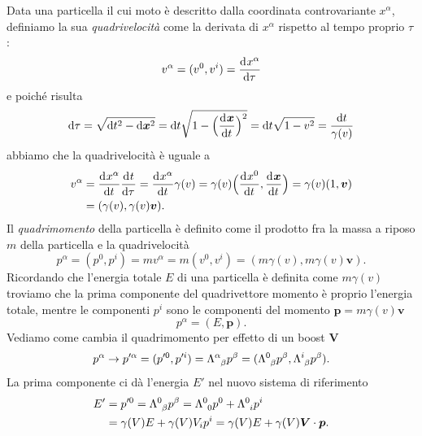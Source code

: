 Data una particella il cui moto è descritto dalla coordinata controvariante
$x^{\alpha}$, definiamo la sua \emph{quadrivelocità} come
la derivata di $x^{\alpha}$ rispetto al tempo proprio $\tau$:
\begin{equation}
  v^{\alpha} = (v^{0}, v^{i}) =\frac{{\mathop{}\!\mathrm{d}^{}}x^{\alpha}}{\mathop{}\!\mathrm{d} {\tau}^{}}
\end{equation}
e poiché risulta
\begin{equation}
  \dd \tau = \sqrt{\dd t^{2} - \dd \bm{x}^{2}} = \dd t \sqrt{1 -
    \Big(\toder{\bm{x}}{t}\Big)^{2}} = \dd t\sqrt{1 - v^{2}} = \frac{\dd
    t}{\gamma(v)}
\end{equation}
abbiamo che la quadrivelocità è uguale a
\begin{equation}
  \begin{split}
    v^{\alpha} &= \toder{x^{\alpha}}{t}\toder{t}{\tau} = \toder{x^{\alpha}}{t}
    \gamma(v) = \gamma(v) \Big(\toder{x^{0}}{t}, \toder{\bm{x}}{t}\Big) =
    \gamma(v)(1,\bm{v}) \\
    &= (\gamma(v), \gamma(v)\bm{v}).
  \end{split}
\end{equation}
Il \emph{quadrimomento} della particella è definito come il
prodotto fra la massa a riposo $m$ della particella e la quadrivelocità
\begin{equation}
  p^{\alpha} = (p^{0},p^{i}) = m v^{\alpha} = m (v^{0}, v^{i}) = (m\gamma(v),
  m\gamma(v)\bm{v}).
\end{equation}
Ricordando che l'energia totale $E$ di una particella è definita come $m\gamma(v)$
troviamo che la prima componente del quadrivettore momento è proprio l'energia
totale, mentre le componenti $p^{i}$ sono le componenti del momento
$\bm{p} = m\gamma(v)\bm{v}$
\begin{equation}
  p^{\alpha} = (E, \bm{p}).
\end{equation}
Vediamo come cambia il quadrimomento per effetto di un boost $\bm{V}$
\begin{equation}
  p^{\alpha} \to p'^{\alpha} = (p'^{0}, p'^{i}) =
  \tensor{\Lambda}{^{\alpha}_{\beta}} p^{\beta} =
  (\tensor{\Lambda}{^{0}_{\beta}}p^{\beta},
  \tensor{\Lambda}{^{i}_{\beta}}p^{\beta}).
\end{equation}
La prima componente ci dà l'energia $E'$ nel nuovo sistema di riferimento
\begin{equation}
  \begin{split}
    E' &= p'^{0} = \tensor{\Lambda}{^{0}_{\beta}}p^{\beta} =
    \tensor{\Lambda}{^{0}_{0}}p^{0} + \tensor{\Lambda}{^{0}_{i}}p^{i} \\
    &= \gamma(V) E + \gamma(V) V_{i}p^{i} = \gamma(V) E + \gamma(V)
    \bm{V}\cdot\bm{p}.
  \end{split}
\end{equation}
